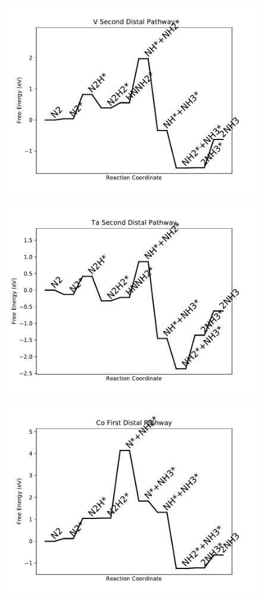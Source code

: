 \begin{figure}
\includegraphics[width=0.8\linewidth]{data/plots/V_distal_2.pdf}
\end{figure}

\begin{figure}
\includegraphics[width=0.8\linewidth]{data/plots/Ta_distal_2.pdf}
\end{figure}

\begin{figure}
\includegraphics[width=0.8\linewidth]{data/plots/Co_distal_1.pdf}
\end{figure}


